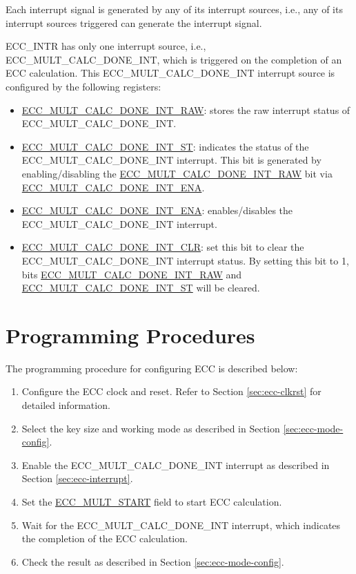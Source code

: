 \documentclass[main\_\_EN.tex]{subfiles}
\begin{document}
\begin{tiplisting}
Each interrupt signal is generated by any of its interrupt sources, i.e., any of its interrupt sources triggered can generate the interrupt signal.
\end{tiplisting}

ECC\_INTR has only one interrupt source, i.e., \label{int:ECCMULTCALCDONEINT}ECC\_MULT\_CALC\_DONE\_INT, which is triggered on the completion of an ECC calculation. This ECC\_MULT\_CALC\_DONE\_INT interrupt source is configured by the following registers:

\begin{itemize}
    \item \hyperref[fielddesc:ECCMULTCALCDONEINTRAW]{ECC\_MULT\_CALC\_DONE\_INT\_RAW}: stores the raw interrupt status of ECC\_MULT\_CALC\_DONE\_INT.
    \item \hyperref[fielddesc:ECCMULTCALCDONEINTST]{ECC\_MULT\_CALC\_DONE\_INT\_ST}: indicates the status of the ECC\_MULT\_CALC\_DONE\_INT interrupt. This bit is generated by enabling/disabling the \hyperref[fielddesc:ECCMULTCALCDONEINTRAW]{ECC\_MULT\_CALC\_DONE\_INT\_RAW} bit via \hyperref[fielddesc:ECCMULTCALCDONEINTENA]{ECC\_MULT\_CALC\_DONE\_INT\_ENA}.
    \item \hyperref[fielddesc:ECCMULTCALCDONEINTENA]{ECC\_MULT\_CALC\_DONE\_INT\_ENA}: enables/disables the ECC\_MULT\_CALC\_DONE\_INT interrupt.
    \item \hyperref[fielddesc:ECCMULTCALCDONEINTCLR]{ECC\_MULT\_CALC\_DONE\_INT\_CLR}: set this bit to clear the ECC\_MULT\_CALC\_DONE\_INT interrupt status. By setting this bit to 1, bits \hyperref[fielddesc:ECCMULTCALCDONEINTRAW]{ECC\_MULT\_CALC\_DONE\_INT\_RAW} and  \hyperref[fielddesc:ECCMULTCALCDONEINTST]{ECC\_MULT\_CALC\_DONE\_INT\_ST} will be cleared.
\end{itemize}

\section{Programming Procedures}

The programming procedure for configuring ECC is described below:

\begin{enumerate}
    \item Configure the ECC clock and reset. Refer to Section \ref{sec:ecc-clkrst} for detailed information.
    \item Select the key size and working mode as described in Section \ref{sec:ecc-mode-config}.
    \item Enable the ECC\_MULT\_CALC\_DONE\_INT interrupt as described in Section \ref{sec:ecc-interrupt}.
    \item Set the \hyperref[fielddesc:ECCMULTSTART]{ECC\_MULT\_START} field to start ECC calculation.
    \item Wait for the ECC\_MULT\_CALC\_DONE\_INT interrupt, which indicates the completion of the ECC calculation.
    \item Check the result as described in Section \ref{sec:ecc-mode-config}.
\end{enumerate}
\end{document}
